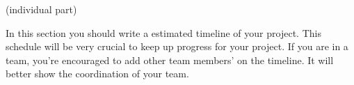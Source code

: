 \documentclass[letterpaper, 10 pt, conference]{ieeeconf}  %
\begin{document}
(individual part)

In this section you should write a estimated timeline of your project. This schedule will be very crucial to keep up progress for your project. If you are in a team, you're encouraged to add other team members' on the timeline. It will better show the coordination of your team.
   

\addtolength{\textheight}{-12cm}   %



\end{document}
